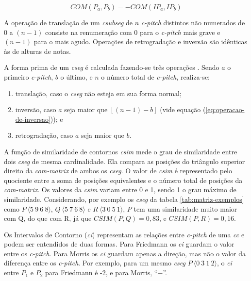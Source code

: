 \documentclass[brazil]{article}
\newcommand{\termo}[1]{\textit{#1}}
\begin{document}
\begin{equation}
  \label{eq:operacao-de-inversao-na-comparacao}
  COM(P_a,P_b)=-COM(IP_a,IP_b)
\end{equation}

A operação de translação de um \termo{csubseg} de $n$ \termo{c-pitch}
distintos não numerados de $0$ a $(n-1)$ consiste na renumeração com
$0$ para o \termo{c-pitch} mais grave e $(n-1)$ para o mais
agudo. Operações de retrogradação e inversão são idênticas às de
alturas de notas.

A forma prima de um \termo{cseg} é calculada fazendo-se três operações
\cite{marvin.ea87:relating}. Sendo $a$ o primeiro \termo{c-pitch}, $b$
o último, e $n$ o número total de \termo{c-pitch}, realiza-se:
\begin{enumerate}
\item translação, caso o \termo{cseg} não esteja em sua forma normal;
\item inversão, caso $a$ seja maior que $[(n-1) - b]$ (vide equação
  (\ref{eq:operacao-de-inversao})); e
\item retrogradação, caso $a$ seja maior que $b$.
\end{enumerate}

A função de similaridade de contornos \termo{csim} mede o grau de
similaridade entre dois \termo{cseg} de mesma cardinalidade. Ela
compara as posições do triângulo superior direito da
\termo{com-matrix} de ambos os \termo{cseg}. O valor de \termo{csim} é
representado pelo quociente entre a soma de posições equivalentes e o
número total de posições da \termo{com-matrix}. Os valores da
\termo{csim} variam entre 0 e 1, sendo 1 o grau máximo de
similaridade. Considerando, por exemplo os \termo{cseg} da tabela
\ref{tab:matriz-exemplos} como $P\:\langle5\:9\:6\:8\rangle$,
$Q\:\langle5\:7\:6\:8\rangle$ e $R\:\langle3\:0\:5\:1\rangle$, $P$ tem
uma similaridade muito maior com Q, do que com R, já que
$CSIM(P,Q)=0,83$, e $CSIM(P,R)=0,16$.

Os Intervalos de Contorno (\termo{ci}) representam as relações entre
\termo{c-pitch} de uma \termo{cc} e podem ser entendidos de duas
formas. Para Friedmann \cite{friedmann85:methodology} os \termo{ci}
guardam o valor entre os \termo{c-pitch}. Para Morris
\cite{morris93:directions} os \termo{ci} guardam apenas a direção, mas
não o valor da diferença entre os \termo{c-pitch}. Por exemplo, para
um mesmo \termo{cseg} $P\:\langle0\:3\:1\:2\rangle$, o \termo{ci}
entre $P_1$ e $P_2$ para Friedmann é -2, e para Morris, ``$-$''.
\end{document}
